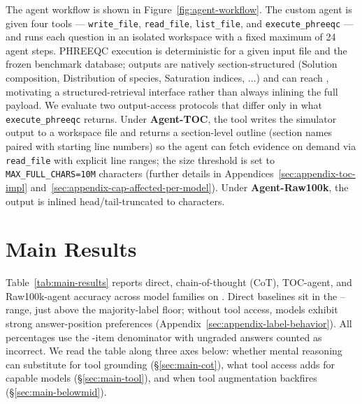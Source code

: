 \documentclass{article}
\begin{document}
The agent workflow is shown in Figure~\ref{fig:agent-workflow}. The custom agent is given four tools --- \texttt{write\_file}, \texttt{read\_file}, \texttt{list\_file}, and \texttt{execute\_phreeqc} --- and runs each question in an isolated workspace with a fixed maximum of 24 agent steps. PHREEQC execution is deterministic for a given input file and the frozen benchmark database; outputs are natively section-structured (Solution composition, Distribution of species, Saturation indices, $\dots$) and can reach \OutputMaxChars{}, motivating a structured-retrieval interface rather than always inlining the full payload. We evaluate two output-access protocols that differ only in what \texttt{execute\_phreeqc} returns. Under \textbf{Agent-TOC}, the tool writes the simulator output to a workspace file and returns a section-level outline (section names paired with starting line numbers) so the agent can fetch evidence on demand via \texttt{read\_file} with explicit line ranges; the size threshold is set to \texttt{MAX\_FULL\_CHARS=10M} characters (further details in Appendices~\ref{sec:appendix-toc-impl} and~\ref{sec:appendix-cap-affected-per-model}). Under \textbf{Agent-Raw100k}, the output is inlined head/tail-truncated to \RawCapChars{} characters.

\section{Main Results}
\label{sec:main-results}

Table~\ref{tab:main-results} reports direct, chain-of-thought (CoT), TOC-agent, and Raw100k-agent accuracy across model families on \BenchName. Direct baselines sit in the \GPTFiveFourOneShot--\OpusOneShot{} range, just above the \BenchMajority{} majority-label floor; without tool access, models exhibit strong answer-position preferences (Appendix~\ref{sec:appendix-label-behavior}). All percentages use the \BenchN-item denominator with ungraded answers counted as incorrect. We read the table along three axes below: whether mental reasoning can substitute for tool grounding (§\ref{sec:main-cot}), what tool access adds for capable models (§\ref{sec:main-tool}), and when tool augmentation backfires (§\ref{sec:main-belowmid}).
\end{document}
